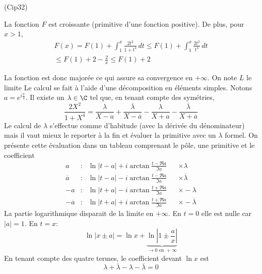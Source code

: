 \begin{tiny}(Cip32)\end{tiny} La fonction $F$ est croissante (primitive d'une fonction positive). De plus, pour $x>1$,
\begin{multline*}
F(x) = F(1) + \int_1^x\frac{2t^2}{1+t^4}\,dt
\leq F(1) + \int_1^x\frac{2t^2}{t^4}\,dt \\
\leq F(1) + 2 - \frac{2}{x} \leq F(1) + 2
\end{multline*}

La fonction est donc majorée ce qui assure sa convergence en $+\infty$. On note $L$ le limite\newline
Le calcul se fait à l'aide d'une décomposition en éléments simples. Notons $a=e^{i\frac{\pi}{4}}$. Il existe un $\lambda\in \C$ tel que, en tenant compte des symétries,
\begin{displaymath}
\frac{2X^2}{1+X^4}
= \frac{\lambda}{X-a} + \frac{\overline{\lambda}}{X-\overline{a}}  - \frac{\lambda}{X+a}  - \frac{\overline{\lambda}}{X+\overline{a}}  
\end{displaymath}
Le calcul de $\lambda$ s'effectue comme d'habitude (avec la dérivée du dénominateur) mais il vaut mieux le reporter à la fin et évaluer la primitive avec un $\lambda$ formel.\newline
On présente cette évaluation dans un tableau comprenant le pôle, une primitive et le coefficient
\begin{align*}
a             &:  &\ln|t-a| + i\arctan \frac{t - \Re a}{\Im a} & &\times \lambda \\
\overline{a}  &:  &\ln|t-a| - i\arctan \frac{t - \Re a}{\Im a} & &\times \overline{\lambda} \\
-a            &:  &\ln|t+a| - i\arctan \frac{t + \Re a}{\Im a} & &\times -\lambda \\
-\overline{a} &:  &\ln|t+a| + i\arctan \frac{t + \Re a}{\Im a} & &\times -\overline{\lambda}
\end{align*}
La partie logarithmique disparait de la limite en $+\infty$. En $t=0$ elle est nulle car $|a|=1$. En $t=x$:
\begin{displaymath}
\ln|x \pm a| = \ln x + \underset{\rightarrow 0 \text{ en }+\infty}{\underbrace{\ln|1 \pm \frac{a}{x}|}}
\end{displaymath}
En tenant compte des quatre termes, le coefficient devant $\ln x$ est
\begin{displaymath}
  \lambda + \overline{\lambda} - \lambda - \overline{\lambda} = 0  
\end{displaymath}
